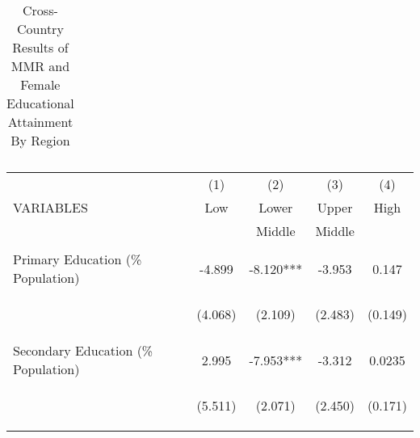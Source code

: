 \begin{subtables}
\begin{landscape}
\begin{table}[htpb!]
\begin{center}
\begin{tabular}{lccccccc}
\bottomrule															
\end{tabular}															
\caption{Cross-Country Results of MMR and Female Educational Attainment By Region}															
\vspace{-6mm}															
\label{tab:MMRregion}															
\end{center}															
\end{table}															
\end{landscape}

\begin{table}[htpb!]									
\begin{center}									
\begin{tabular}{lcccc}	\toprule								
	&	(1)	&	(2)	&	(3)	&	(4)	\\ 
VARIABLES	&	Low	&	Lower	&	Upper	&	High	\\
		&		&	Middle	&	Middle	&		\\ \midrule
\vspace{4pt}	&	\begin{footnotesize}\end{footnotesize}	&	\begin{footnotesize}\end{footnotesize}	&	\begin{footnotesize}\end{footnotesize}	&	\begin{footnotesize}\end{footnotesize}	\\
Primary Education (\% Population)	&	-4.899	&	-8.120***	&	-3.953	&	0.147	\\
	& \begin{footnotesize}	(4.068)	\end{footnotesize} & \begin{footnotesize}	(2.109)	\end{footnotesize} & \begin{footnotesize}	(2.483)	\end{footnotesize} & \begin{footnotesize}	(0.149)	\end{footnotesize} \\
Secondary Education (\% Population)	&	2.995	&	-7.953***	&	-3.312	&	0.0235	\\
	& \begin{footnotesize}	(5.511)	\end{footnotesize} & \begin{footnotesize}	(2.071)	\end{footnotesize} & \begin{footnotesize}	(2.450)	\end{footnotesize} & \begin{footnotesize}	(0.171)	\end{footnotesize} \\

\end{tabular}
\end{center}
\end{table}
\end{subtables}
